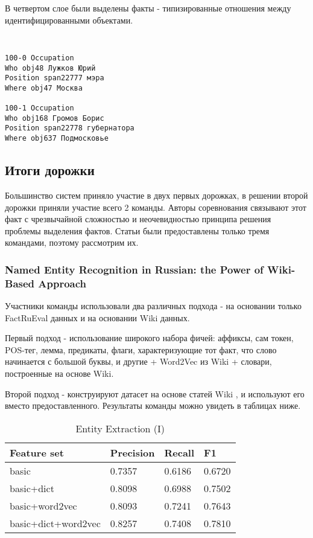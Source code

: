 В четвертом слое были выделены факты - типизированные отношения между идентифицированными объектами.

{\tt \small
\begin{verbatim}
100-0 Occupation
Who obj48 Лужков Юрий
Position span22777 мэра
Where obj47 Москва

100-1 Occupation
Who obj168 Громов Борис
Position span22778 губернатора
Where obj637 Подмосковье
\end{verbatim}
}

\subsection{Итоги дорожки}

Большинство систем приняло участие в двух первых дорожках, в решении второй дорожки приняли участие всего 2 команды. Авторы соревнования связывают этот факт с чрезвычайной сложностью и неочевидностью принципа решения проблемы выделения фактов. Статьи были предоставлены только тремя командами, поэтому рассмотрим их.

\subsubsection{Named Entity Recognition in Russian: the Power of Wiki-Based Approach}

Участники команды использовали два различных подхода - на основании только FactRuEval данных и на основании Wiki данных. 

Первый подход - использование широкого набора фичей: аффиксы, сам токен, POS-тег, лемма, предикаты, флаги, характеризующие тот факт, что слово начинается с большой буквы, и другие + Word2Vec из Wiki + словари, построенные на основе Wiki. 

Второй подход - конструируют датасет на основе статей Wiki \cite{NOTHMAN2013151}, и используют его вместо предоставленного. Результаты команды можно увидеть в таблицах ниже.

\begin{table}[ht]
\centering
\caption{Entity Extraction (I)}
\label{factrueval_1_1}
\begin{tabular}{|l|l|l|l|}
\hline
Feature set               & Precision & Recall & F1     \\ \hline
basic                     & 0.7357    & 0.6186 & 0.6720 \\ \hline
basic+dict                & 0.8098    & 0.6988 & 0.7502 \\ \hline
basic+word2vec            & 0.8093    & 0.7241 & 0.7643 \\ \hline
basic+dict+word2vec       & 0.8257    & 0.7408 & 0.7810 \\ \hline
\end{tabular}
\end{table}




